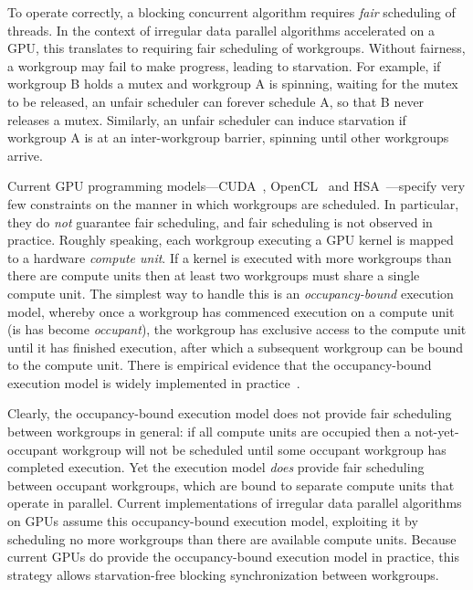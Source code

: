 \documentclass[nocopyrightspace]{sigplanconf-pldi16}
\begin{document}
To operate correctly, a blocking concurrent algorithm requires
\emph{fair} scheduling of threads.  In the context of irregular data
parallel algorithms accelerated on a GPU, this translates to requiring
fair scheduling of workgroups.  Without fairness, a workgroup may fail
to make progress, leading to starvation.  For example, if workgroup B
holds a mutex and workgroup A is spinning, waiting for the mutex to be
released, an unfair scheduler can forever schedule A, so that B never
releases a mutex.  Similarly, an unfair scheduler can induce
starvation if workgroup A is at an inter-workgroup barrier, spinning
until other workgroups arrive.

Current GPU programming models---CUDA~\cite{...}, OpenCL~\cite{...}
and HSA~\cite{...}---specify very few constraints on the manner in
which workgroups are scheduled.  In particular, they do \emph{not}
guarantee fair scheduling, and fair scheduling is not observed in
practice.  Roughly speaking, each workgroup executing a GPU kernel is
mapped to a hardware \emph{compute unit}.  If a kernel is executed
with more workgroups than there are compute units then at least two
workgroups must share a single compute unit.  The simplest way to
handle this is an \emph{occupancy-bound} execution model, whereby once
a workgroup has commenced execution on a compute unit (is has become
\emph{occupant}), the workgroup has exclusive access to the compute
unit until it has finished execution, after which a subsequent
workgroup can be bound to the compute unit.  There is empirical
evidence that the occupancy-bound execution model is widely
implemented in practice~\cite{...}.

Clearly, the occupancy-bound execution model does not provide fair
scheduling between workgroups in general: if all compute units are
occupied then a not-yet-occupant workgroup will not be scheduled until
some occupant workgroup has completed execution.  Yet the execution
model \emph{does} provide fair scheduling between occupant workgroups,
which are bound to separate compute units that operate in parallel.
Current implementations of irregular data parallel algorithms on GPUs
assume this occupancy-bound execution model, exploiting it by
scheduling no more workgroups than there are available compute units.
Because current GPUs do provide the occupancy-bound execution model in
practice, this strategy allows starvation-free blocking
synchronization between workgroups.
\end{document}

